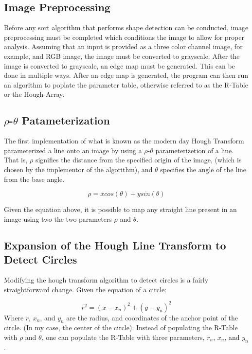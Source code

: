 \documentclass[conference]{IEEEtran}
\begin{document}
\subsection{Image Preprocessing}
Before any sort algorithm that performs shape detection can be conducted, image preprocessing must be completed which conditions the image to allow for proper analysis. 
Assuming that an input is provided as a three color channel image, for example, and RGB image, the image must be converted to grayscale. 
After the image is converted to grayscale, an edge map must be generated. This can be done in multiple ways. 
After an edge map is generated, the program can then run an algorithm to poplate the parameter table, otherwise referred to as the R-Table or the Hough-Array. 




\subsection{$\rho$-$\theta$ Patameterization}
The first implementation of what is known as the modern day Hough Transform parameterized a line onto an image by using a $\rho$-$\theta$ parameterizetion of a line. 
That is, $\rho$ signifies the distance from the specified origin of the image, (which is chosen by the implementor of the algorithm), and $\theta$ specifies the angle of the line from the base angle. 

\begin{equation}
  \rho = x cos(\theta) + y sin(\theta) 
  \label{eq:rho-theta-parameterization}
\end{equation}

Given the equation above, it is possible to map any straight line present in an image using two the two parameters $\rho$ and $\theta$. 

\subsection{Expansion of the Hough Line Transform to Detect Circles}
Modifying the hough transform algorithm to detect circles is a fairly straightforward change. 
Given the equation of a circle: 

\begin{equation}
  r^2 = (x - x_n)^2 + (y - y_n)^2
  \label{eq:circle-parameterization}
\end{equation}
Where $r$, $x_n$, and $y_n$ are the radius, and coordinates of the anchor point of the circle. (In my case, the center of the circle). 
Instead of populating the R-Table with $\rho$ and $\theta$, one can populate the R-Table with three parameters, $r_{n}$, $x_{n}$, and $y_{n}$. 
\end{document}
